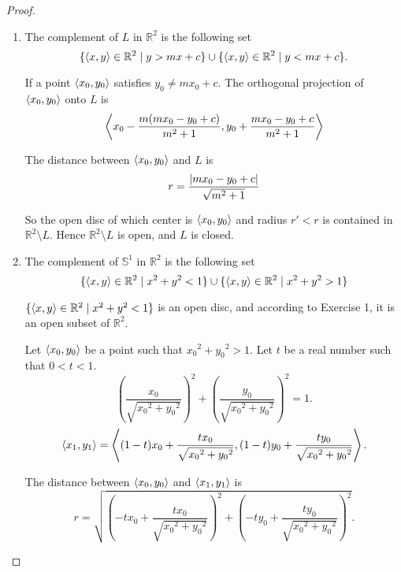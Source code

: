 \begin{proof}
	\begin{enumerate}[label={(\roman*)}]
		\item The complement of $L$ in $\mathbb{R}^{2}$ is the following set
		      \[
			      \{ \left\langle{x, y}\right\rangle\in\mathbb{R}^{2} \mid y > mx + c \} \cup \{ \left\langle{x, y}\right\rangle\in\mathbb{R}^{2} \mid y < mx + c \}.
		      \]

		      If a point $\left\langle{x_{0}, y_{0}}\right\rangle$ satisfies $y_{0} \ne mx_{0} + c$. The orthogonal projection of $\left\langle{x_{0}, y_{0}}\right\rangle$ onto $L$ is
		      \[
			      \left\langle{x_{0} - \frac{m(mx_{0} - y_{0} + c)}{m^{2} + 1}, y_{0} + \frac{mx_{0} - y_{0} + c}{m^{2} + 1}}\right\rangle
		      \]

		      The distance between $\left\langle{x_{0}, y_{0}}\right\rangle$ and $L$ is
		      \[
			      r = \frac{\left\vert{mx_{0} - y_{0} + c}\right\vert}{\sqrt{m^{2} + 1}}
		      \]

		      So the open disc of which center is $\left\langle{x_{0}, y_{0}}\right\rangle$ and radius $r' < r$ is contained in $\mathbb{R}^{2}\setminus L$. Hence $\mathbb{R}^{2}\setminus L$ is open, and $L$ is closed.
		\item The complement of $\mathbb{S}^{1}$ in $\mathbb{R}^{2}$ is the following set
		      \[
			      \{ \left\langle{x, y}\right\rangle\in\mathbb{R}^{2} \mid x^{2} + y^{2} < 1 \} \cup \{ \left\langle{x, y}\right\rangle\in\mathbb{R}^{2} \mid x^{2} + y^{2} > 1 \}
		      \]

		      $\{ \left\langle{x, y}\right\rangle\in\mathbb{R}^{2} \mid x^{2} + y^{2} < 1 \}$ is an open disc, and according to Exercise 1, it is an open subset of $\mathbb{R}^{2}$.

		      Let $\left\langle{x_{0}, y_{0}}\right\rangle$ be a point such that ${x_{0}}^{2} + {y_{0}}^{2} > 1$. Let $t$ be a real number such that $0 < t < 1$.
		      \[
			      {\left(\frac{x_{0}}{\sqrt{{x_{0}}^{2} + {y_{0}}^{2}}}\right)}^{2} + {\left(\frac{y_{0}}{\sqrt{{x_{0}}^{2} + {y_{0}}^{2}}}\right)}^{2} = 1.
		      \]
		      \[
			      \left\langle{x_{1}, y_{1}}\right\rangle = \left\langle{(1-t)x_{0} + \frac{tx_{0}}{\sqrt{{x_{0}}^{2} + {y_{0}}^{2}}}, (1-t)y_{0} + \frac{ty_{0}}{\sqrt{{x_{0}}^{2} + {y_{0}}^{2}}}}\right\rangle.
		      \]

		      The distance between $\left\langle{x_{0}, y_{0}}\right\rangle$ and $\left\langle{x_{1}, y_{1}}\right\rangle$ is
		      \[
			      r = \sqrt{{\left(-tx_{0} + \frac{tx_{0}}{\sqrt{{x_{0}}^{2} + {y_{0}}^{2}}}\right)}^{2} + {\left(-ty_{0} + \frac{ty_{0}}{\sqrt{{x_{0}}^{2} + {y_{0}}^{2}}}\right)}^{2}}.
		      \]


\end{enumerate}
\end{proof}
